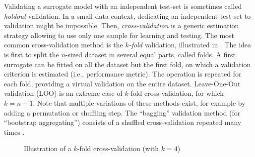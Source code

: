 Validating a surrogate model with an independent test-set is sometimes called \textit{holdout} validation.
In a small-data context, dedicating an independent test set to validation might be impossible.
Then, \textit{cross-validation} is a generic estimation strategy allowing to use only one sample for learning and testing. 
The most common cross-validation method is the \textit{$k$-fold} validation, illustrated in . 
The idea is first to split the $n$-sized dataset in several equal parts, called folds. 
A first surrogate can be fitted on all the dataset but the first fold, on which a validation criterion is estimated (i.e., performance metric). 
The operation is repeated for each fold, providing a virtual validation on the entire dataset. 
Leave-One-Out validation (LOO) is an extreme case of $k$-fold cross-validation, for which $k=n-1$. 
Note that multiple variations of these methods exist, for example by adding a permutation or shuffling step. 
The ``bagging'' validation method (for ``bootstrap aggregating'') consists of a shuffled cross-validation repeated many times \citep{breiman_1996_bagging}. 


\begin{figure}[ht]
    \centering
      \caption{Illustration of a $k$-fold cross-validation (with $k=4$)} 
      \label{fig:kfold}
\end{figure}



